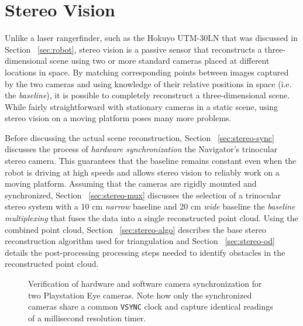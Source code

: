 \documentclass[twocolumn,11pt]{article}
\begin{document}
\section{Stereo Vision}
\label{sec:stereo}
Unlike a laser rangerfinder, such as the Hokuyo UTM-30LN that was discussed in
Section ~\ref{sec:robot}, stereo vision is a passive sensor that reconstructs a
three-dimensional scene using two or more standard cameras placed at different
locations in space. By matching corresponding points between images captured by
the two cameras and using knowledge of their relative positions in space (i.e.
the \textit{baseline}), it is possible to completely reconstruct a three-dimensional
scene. While fairly straightforward with stationary cameras in a static scene,
using stereo vision on a moving platform poses many more problems.

Before discussing the actual scene reconstruction, Section
~\ref{sec:stereo-sync} discusses the process of \textit{hardware
synchronization} the Navigator's trinocular stereo camera. This guarantees that
the baseline remains constant even when the robot is driving at high speeds and
allows stereo vision to reliably work on a moving platform. Assuming that the
cameras are rigidly mounted and synchronized, Section ~\ref{sec:stereo-mux}
discusses the selection of a trinocular stereo system with a 10 cm
\textit{narrow} baseline and 20 cm \textit{wide} baseline the \textit{baseline
multiplexing} that fuses the data into a single reconstructed point cloud.
Using the combined point cloud, Section ~\ref{sec:stereo-algo} describes the
base stereo reconstruction algorithm used for triangulation and Section
~\ref{sec:stereo-od} details the post-processing processing steps needed to
identify obstacles in the reconstructed point cloud.

\begin{figure*}[t]
	\centering
	\caption{
		Verification of hardware and software camera synchronization for two
		Playstation Eye cameras. Note how only the synchronized cameras share a
		common \texttt{VSYNC} clock and capture identical readings of a
		millisecond resolution timer.
	}
	\label{fig:stereo-sync}
\end{figure*}
\end{document}
